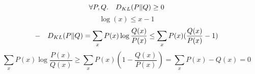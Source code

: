 \begin{answer}
$$\forall P, Q. \quad D_{KL}(P\|Q) \geq 0$$
$$\log(x) \leq x - 1$$
$$-\quad D_{KL}(P\|Q) = \sum_x P(x) \log\frac{Q(x)}{P(x)} \leq \sum_x P(x)(\frac{Q(x)}{P(x)} - 1)$$
$$\sum_x P(x) \log\frac{P(x)}{Q(x)} \geq \sum_x P(x)(1-\frac{Q(x)}{P(x)}) = \sum_x P(x) - Q(x) = 0$$
\end{answer}
